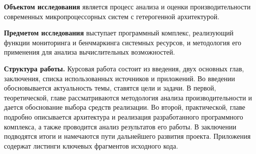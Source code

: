 \textbf{Объектом исследования} является процесс анализа и оценки производительности современных микропроцессорных систем с гетерогенной архитектурой.

\textbf{Предметом исследования} выступает программный комплекс, реализующий функции мониторинга и бенчмаркинга системных ресурсов, и методология его применения для анализа вычислительных возможностей.

\textbf{Структура работы.} Курсовая работа состоит из введения, двух основных глав, заключения, списка использованных источников и приложений. Во введении обосновывается актуальность темы, ставятся цели и задачи. В первой, теоретической, главе рассматриваются методология анализа производительности и дается обоснование выбора средств реализации. Во второй, практической, главе подробно описывается архитектура и реализация разработанного программного комплекса, а также проводится анализ результатов его работы. В заключении подводятся итоги и намечаются пути дальнейшего развития проекта. Приложения содержат листинги ключевых фрагментов исходного кода.

